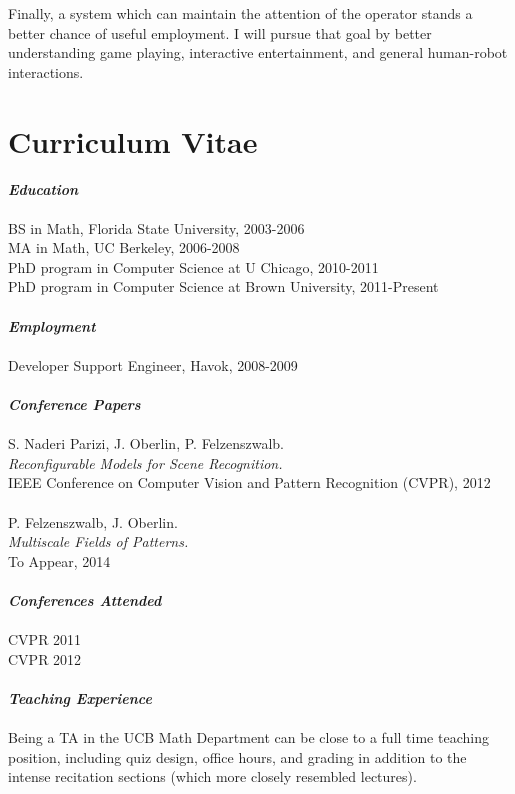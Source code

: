 \documentclass[12pt]{article}
\numberwithin{equation}{section}
\numberwithin{table}{section}
\numberwithin{figure}{section}
\begin{document}
Finally, a system which can maintain the attention of the operator stands a better chance of 
useful employment. I will pursue that goal by better understanding game playing, 
interactive entertainment, and general human-robot interactions.


\newpage

\section{Curriculum Vitae}
\textbf{\emph{Education}}\\
 \\
BS in Math, Florida State University, 2003-2006 \\
MA in Math, UC Berkeley, 2006-2008 \\
PhD program in Computer Science at U Chicago, 2010-2011 \\
PhD program in Computer Science at Brown University, 2011-Present \\
 \\ 
\textbf{\emph{Employment}}\\
\\
Developer Support Engineer, Havok, 2008-2009 \\
 \\
\textbf{\emph{Conference Papers}}\\
 \\
S. Naderi Parizi, J. Oberlin, P. Felzenszwalb.\\
\emph{Reconfigurable Models for Scene Recognition.}\\
IEEE Conference on Computer Vision and Pattern Recognition (CVPR), 2012\\
 \\
P. Felzenszwalb, J. Oberlin.  \\
\emph{Multiscale Fields of Patterns.}\\
To Appear, 2014 \\
 \\
\textbf{\emph{Conferences Attended}}\\
 \\
CVPR 2011\\
CVPR 2012 \\
 \\
\textbf{\emph{Teaching Experience}}\\
 \\
Being a TA in the UCB Math Department can be close to a full time teaching position, including
quiz design, office hours, and grading in addition to the intense recitation sections (which more closely resembled lectures). \\
\end{document}
